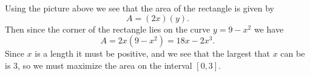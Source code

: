 \documentclass[11pt]{article}
\begin{document}
\begin{enumerate}
  \begin{center}
  \end{center}
  

  \vfill
  {\color{blue}

    Using the picture above we see that the area of the rectangle is
    given by
    \[
    A = (2x)(y).
    \]
    Then since the corner of the rectangle lies on the curve $y=9-x^2$ we have
    \[
    A = 2x(9-x^2) = 18x - 2x^3.
    \]
    Since $x$ is a length it must be positive, and we see that the
    largest that $x$ can be is 3, so we must maximize the area on the
    interval $[0,3]$.

  }
  \vfill



\end{enumerate}
\end{document}
